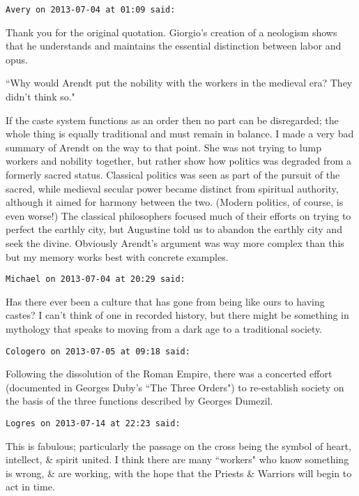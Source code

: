 \begin{footnotesize}
\begin{sffamily}
\hfill

\texttt{Avery on 2013-07-04 at 01:09 said: }

Thank you for the original quotation. Giorgio's creation of a neologism shows that he understands and maintains the essential distinction between labor and opus.

``Why would Arendt put the nobility with the workers in the medieval era? They didn't think so."

If the caste system functions as an order then no part can be disregarded; the whole thing is equally traditional and must remain in balance. I made a very bad summary of Arendt on the way to that point. She was not trying to lump workers and nobility together, but rather show how politics was degraded from a formerly sacred status. Classical politics was seen as part of the pursuit of the sacred, while medieval secular power became distinct from spiritual authority, although it aimed for harmony between the two. (Modern politics, of course, is even worse!) The classical philosophers focused much of their efforts on trying to perfect the earthly city, but Augustine told us to abandon the earthly city and seek the divine. Obviously Arendt's argument was way more complex than this but my memory works best with concrete examples.


\hfill

\texttt{Michael on 2013-07-04 at 20:29 said: }

Has there ever been a culture that has gone from being like ours to having castes? I can't think of one in recorded history, but there might be something in mythology that speaks to moving from a dark age to a traditional society.


\hfill

\texttt{Cologero on 2013-07-05 at 09:18 said: }

Following the dissolution of the Roman Empire, there was a concerted effort (documented in Georges Duby's ``The Three Orders") to re-establish society on the basis of the three functions described by Georges Dumezil.


\hfill

\texttt{Logres on 2013-07-14 at 22:23 said: }

This is fabulous; particularly the passage on the cross being the symbol of heart, intellect, \& spirit united. I think there are many ``workers" who know something is wrong, \& are working, with the hope that the Priests \& Warriors will begin to act in time.


\hfill


\end{sffamily}
\end{footnotesize}

